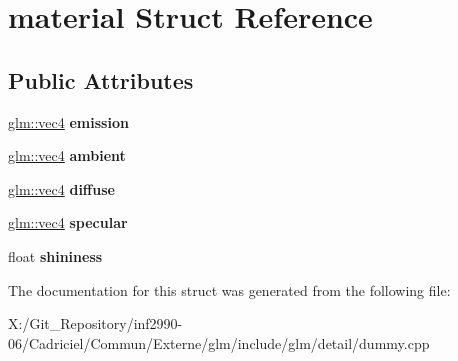 \hypertarget{structmaterial}{\section{material Struct Reference}
\label{structmaterial}
}
\subsection*{Public Attributes}
\begin{DoxyCompactItemize}
\item 
\hypertarget{structmaterial_a76b696726a2ea73e6840001821942bc3}{\hyperlink{group__core__types_ga5881b1b022d7fd1b7218f5916532dd02}{glm\-::vec4} {\bfseries emission}}\label{structmaterial_a76b696726a2ea73e6840001821942bc3}

\item 
\hypertarget{structmaterial_a944296102e90b1610967530458f40ba1}{\hyperlink{group__core__types_ga5881b1b022d7fd1b7218f5916532dd02}{glm\-::vec4} {\bfseries ambient}}\label{structmaterial_a944296102e90b1610967530458f40ba1}

\item 
\hypertarget{structmaterial_a506a0cc33282fa76872c6aeebd688b39}{\hyperlink{group__core__types_ga5881b1b022d7fd1b7218f5916532dd02}{glm\-::vec4} {\bfseries diffuse}}\label{structmaterial_a506a0cc33282fa76872c6aeebd688b39}

\item 
\hypertarget{structmaterial_a452d07b4570da7204caeaf798cd01a77}{\hyperlink{group__core__types_ga5881b1b022d7fd1b7218f5916532dd02}{glm\-::vec4} {\bfseries specular}}\label{structmaterial_a452d07b4570da7204caeaf798cd01a77}

\item 
\hypertarget{structmaterial_aa3740fd7908ec5a11bbc4a4bd5b21abc}{float {\bfseries shininess}}\label{structmaterial_aa3740fd7908ec5a11bbc4a4bd5b21abc}

\end{DoxyCompactItemize}


The documentation for this struct was generated from the following file\-:\begin{DoxyCompactItemize}
\item 
X\-:/\-Git\-\_\-\-Repository/inf2990-\/06/\-Cadriciel/\-Commun/\-Externe/glm/include/glm/detail/dummy.\-cpp\end{DoxyCompactItemize}
